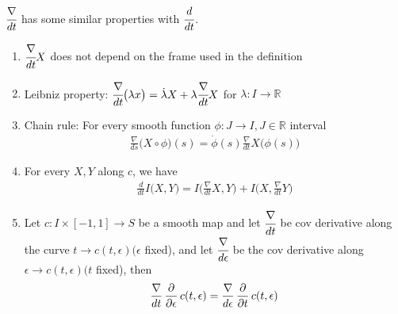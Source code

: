 \documentclass[10pt]{article}
\begin{document}
            \begin{proposition}
                $\cfrac{\nabla}{dt}$ has some similar properties with $\cfrac{d}{dt}$.
                \begin{enumerate}
                    \item $\cfrac{\nabla}{dt}X$ does not depend on the frame used in the definition
                    \item Leibniz property: $\cfrac{\nabla}{dt}\big(\lambda x\big) = \dot{\lambda}X + \lambda\cfrac{\nabla}{dt}X$ for $\lambda: I\rightarrow\mathbb{R}$
                    \item Chain rule: For every smooth function $\phi: J\rightarrow I, J\in\mathbb{R}$ interval
                    \begin{equation*}
                        \begin{aligned}
                            \frac{\nabla}{ds}\big(X\circ \phi\big)(s) = \dot{\phi}(s)\frac{\nabla}{dt}X\big(\phi(s)\big)
                        \end{aligned}
                    \end{equation*}
                    \item For every $X, Y$ along $c$, we have
                    \begin{equation*}
                        \begin{aligned}
                            \frac{d}{dt}I\big(X, Y\big) = I\bigg(\frac{\nabla}{dt}X, Y\bigg) + I\bigg(X, \frac{\nabla}{dt}Y\bigg)
                        \end{aligned}
                    \end{equation*}
                    \item Let $c: I\times[-1, 1]\rightarrow S$ be a smooth map and let $\cfrac{\nabla}{dt}$ be cov derivative along the curve $t\rightarrow c(t,\epsilon)(\epsilon$ fixed), and let $\cfrac{\nabla}{d\epsilon}$ be the cov derivative along $\epsilon\rightarrow c(t,\epsilon)(t$ fixed), then
                    \begin{equation*}
                        \begin{aligned}
                            \frac{\nabla}{dt}\thinspace\frac{\partial}{\partial\epsilon}\thinspace c(t,\epsilon) = \frac{\nabla}{d\epsilon}\thinspace\frac{\partial}{\partial t}\thinspace c(t,\epsilon)
                        \end{aligned}
                    \end{equation*}
                \end{enumerate}
            \end{proposition}
\end{document}
